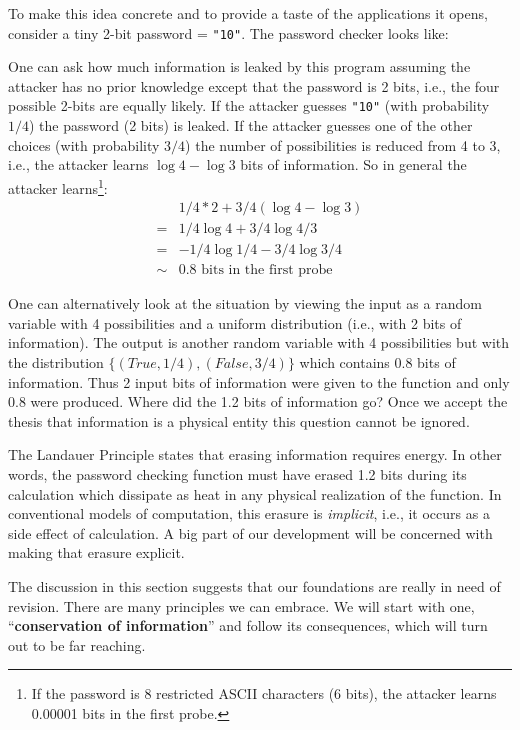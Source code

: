 \documentclass{article}
\begin{document}
To make this idea concrete and to provide a taste of the applications
it opens, consider a tiny 2-bit password = \verb|"10"|. The password
checker looks like:


One can ask how much information is leaked by this program assuming
the attacker has no prior knowledge except that the password is 2
bits, i.e., the four possible 2-bits are equally likely. If the
attacker guesses \verb|"10"| (with probability $1/4$) the password (2
bits) is leaked. If the attacker guesses one of the other choices
(with probability $3/4$) the number of possibilities is reduced from 4
to 3, i.e., the attacker learns $\log{4} - \log{3}$ bits of
information. So in general the attacker learns\footnote{If the
  password is 8 restricted ASCII characters (6 bits), the attacker
  learns 0.00001 bits in the first probe.}:
\[\begin{array}{ll}
   &  1/4 * 2 + 3/4 (\log{4} - \log{3}) \\
  =&  1/4 \log{4} + 3/4 \log{4/3} \\
  =&  - 1/4 \log{1/4} - 3/4 \log{3/4} \\
  \sim& 0.8 \mbox{~bits~in~the~first~probe}
\end{array}\]

One can alternatively look at the situation by viewing the input as a
random variable with 4 possibilities and a uniform distribution (i.e.,
with 2 bits of information). The output is another random variable
with 4 possibilities but with the distribution
$\{ (True, 1/4), (False, 3/4) \}$ which contains 0.8 bits of
information. Thus 2 input bits of information were given to the
function and only 0.8 were produced. Where did the 1.2 bits of
information go? Once we accept the thesis that information is a
physical entity this question cannot be ignored.

The Landauer Principle states that erasing information requires
energy. In other words, the password checking function must have
erased 1.2 bits during its calculation which dissipate as heat in any
physical realization of the function. In conventional models of
computation, this erasure is \emph{implicit}, i.e., it occurs as a
side effect of calculation. A big part of our development will be
concerned with making that erasure explicit.

The discussion in this section suggests that our foundations are really in
need of revision. There are many principles we can embrace.  We will start
with one, ``\textbf{conservation of information}'' and follow its
consequences, which will turn out to be far reaching.
\end{document}
